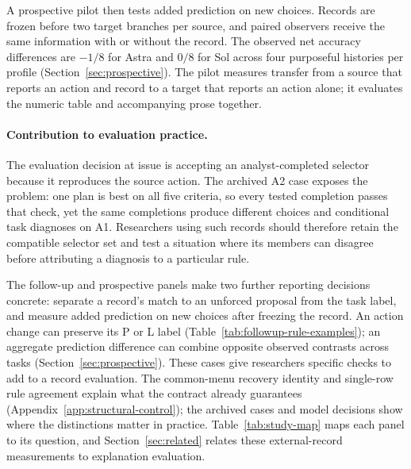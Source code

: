A prospective pilot then tests added prediction on new choices. Records are
frozen before two target branches per source, and paired observers receive
the same information with or without the record. The observed net accuracy
differences are $-1/8$ for Astra and $0/8$ for Sol across four purposeful
histories per profile (Section~\ref{sec:prospective}). The pilot measures
transfer from a source that reports an action and record to a target that
reports an action alone; it evaluates the numeric table and accompanying
prose together.

\paragraph{Contribution to evaluation practice.}
The evaluation decision at issue is accepting an analyst-completed selector
because it reproduces the source action. The archived A2 case exposes the
problem: one plan is best on all five criteria, so every tested completion
passes that check, yet the same completions produce different choices and
conditional task diagnoses on A1. Researchers using such records should
therefore retain the compatible selector set and test a situation where its
members can disagree before attributing a diagnosis to a particular rule.

The follow-up and prospective panels make two further reporting decisions
concrete: separate a record's match to an unforced proposal from the task
label, and measure added prediction on new choices after freezing the record.
An action change can preserve its P or L label
(Table~\ref{tab:followup-rule-examples}); an aggregate prediction difference
can combine opposite observed contrasts across tasks
(Section~\ref{sec:prospective}). These cases give researchers specific checks
to add to a record evaluation. The common-menu recovery identity and
single-row rule agreement explain what the contract already guarantees
(Appendix~\ref{app:structural-control}); the archived cases and model decisions
show where the distinctions matter in practice. Table~\ref{tab:study-map}
maps each panel to its question, and Section~\ref{sec:related} relates these
external-record measurements to explanation evaluation.


